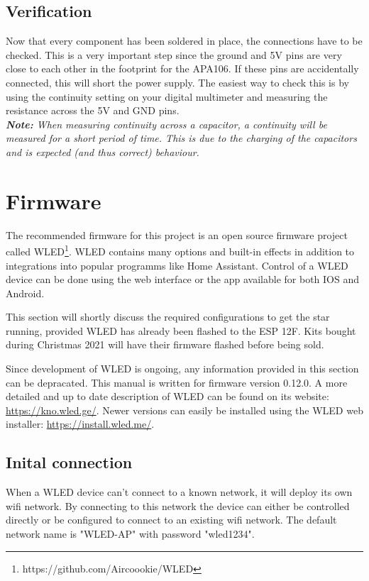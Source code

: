 \documentclass[12pt]{article}
\begin{document}
\subsection{Verification}
Now that every component has been soldered in place, the connections have to be checked.
This is a very important step since the ground and 5V pins are very close to each other in the footprint for the APA106.
If these pins are accidentally connected, this will short the power supply.
The easiest way to check this is by using the continuity setting on your digital multimeter and measuring the resistance across the 5V and GND pins.\\

\vspace{1ex}
\textit{\textbf{Note:} When measuring continuity across a capacitor, a continuity will be measured for a short period of time. This is due to the charging of the capacitors and is expected (and thus correct) behaviour.}


\section{Firmware}
\label{sec:firmware}
The recommended firmware for this project is an open source firmware project called WLED\footnote{https://github.com/Aircoookie/WLED}. WLED contains many options and built-in effects in addition to integrations into popular programms like Home Assistant. Control of a WLED device can be done using the web interface or the app available for both IOS and Android.\\\hfill

\noindent This section will shortly discuss the required configurations to get the star running, provided WLED has already been flashed to the ESP 12F. Kits bought during Christmas 2021 will have their firmware flashed before being sold.

Since development of WLED is ongoing, any information provided in this section can be depracated. This manual is written for firmware version 0.12.0.
A more detailed and up to date description of WLED can be found on its website: \url{https://kno.wled.ge/}. Newer versions can easily be installed using the WLED web installer: \url{https://install.wled.me/}.

\subsection{Inital connection}
When a WLED device can't connect to a known network, it will deploy its own wifi network. By connecting to this network the device can either be controlled directly or be configured to connect to an existing wifi network.
The default network name is "WLED-AP" with password "wled1234".
\end{document}
